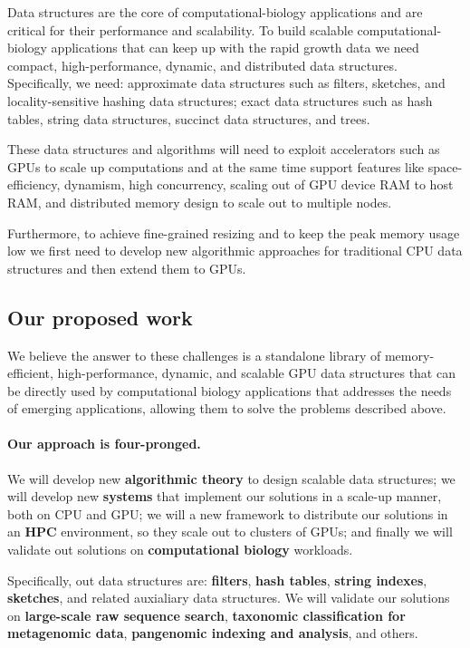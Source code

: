 Data structures are the core of computational-biology applications and are critical for their performance and scalability.
To build scalable computational-biology applications that can keep up with the rapid growth data we need compact, high-performance, dynamic, and distributed data structures. Specifically, we need: approximate data structures such as filters, sketches, and locality-sensitive hashing data structures; exact data structures such as hash tables, string data structures, succinct data structures, and trees.

These data structures and algorithms will need to exploit accelerators such as GPUs to scale up computations and at the same time support  features like space-efficiency, dynamism, high concurrency, scaling out of GPU device RAM to host RAM, and distributed memory design to scale out to multiple nodes.

Furthermore, to achieve fine-grained resizing and to keep the peak memory usage low we first need to develop new algorithmic approaches for traditional CPU data structures and then extend them to GPUs.

\subsection{Our proposed work}

We believe the answer to these challenges is a standalone library of memory-efficient, high-performance, dynamic, and scalable GPU data structures that can be directly used by computational biology applications that addresses the needs of emerging applications, allowing them to solve the problems described above.

\paragraph{Our approach is four-pronged.}  We will develop new \textbf{algorithmic theory} to design scalable data structures; we will develop new \textbf{systems} that implement our solutions in a scale-up manner,  both on CPU and GPU; we will a new framework to distribute our solutions in an \textbf{HPC} environment, so they  scale out to clusters of GPUs; and finally we will validate out solutions on \textbf{computational biology} workloads.

Specifically, out data structures are: \textbf{filters}, \textbf{hash tables}, \textbf{string indexes}, \textbf{sketches}, and related auxialiary data structures.  We will validate our solutions on \textbf{large-scale raw sequence search}, \textbf{taxonomic classification for metagenomic data}, \textbf{pangenomic indexing and analysis}, and others.

